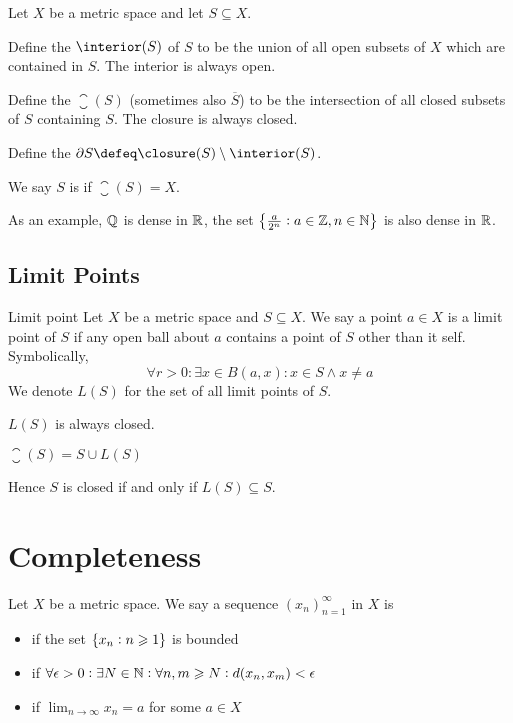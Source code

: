 \documentclass{styles/tufte}
\begin{document}
\begin{definition}{}{}
  Let $X$ be a metric space and let $S \subseteq X$.
  
  Define the  $\interior(S)$ of $S$ to be the union of all open subsets of $X$ which are contained in $S$. The interior is always open.
  
  Define the  $\closure(S)$ (sometimes also $\overline{S}$) to be the intersection of all closed subsets of $S$ containing $S$. The closure is always closed.
  
  Define the  $\partial S \defeq \closure(S) \setminus \interior(S)$.
  
  We say $S$ is  if $\closure(S) = X$.
\end{definition}

As an example, $\mathbb{Q}$ is dense in $\mathbb{R}$, the set $\set{\frac{a}{2^n}: a \in \mathbb{Z}, n \in \mathbb{N}}$ is also dense in $\mathbb{R}$.


\subsection{Limit Points}
  
  \begin{definition}{Limit point}{}
    Let $X$ be a metric space and $S \subseteq X$. We say a point $a \in X$ is a limit point of $S$ if any open ball about $a$ contains a point of $S$ other than it self. Symbolically,
    \[ \forall r > 0: \exists x \in B(a, x): x \in S \land x \neq a \]
    We denote $L(S)$ for the set of all limit points of $S$.
  \end{definition}
  
  $L(S)$ is always closed.
  
  \begin{proposition}{}{}
    $\closure(S) = S \cup L(S)$
    
    Hence $S$ is closed if and only if $L(S) \subseteq S$.
  \end{proposition}



\section{Completeness}

\begin{definition}{}{}
  Let $X$ be a metric space. We say a sequence $(x_n)_{n=1}^\infty$ in $X$ is
  \begin{itemize}
    \item {} if the set $\set{x_n: n \geqslant 1}$ is bounded
    \item {} if $\forall \epsilon > 0: \exists N \in \NN: \forall n, m \geqslant N: d(x_n, x_m) < \epsilon$
    \item {} if $\lim_{n \to \infty} x_n = a$ for some $a \in X$
  \end{itemize}
\end{definition}
\end{document}
